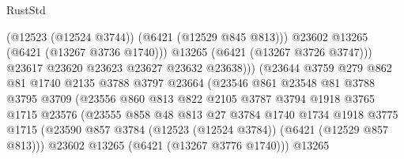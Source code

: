\begin{lexlean}{RustStd}
\begin{coremodule}
                                        (@12523 (@12524 @3744))
                                        (@6421 (@12529 @845 @813)))
                                      @23602
                                      @13265
                                      (@6421 (@13267 @3736 @1740)))
                                    @13265
                                    (@6421 (@13267 @3726 @3747)))
                                  @23617
                                  @23620
                                  @23623
                                  @23627
                                  @23632
                                  @23638)))
                            (@23644
                              @3759
                              @279
                              @862
                              @81
                              @1740
                              @2135
                              @3788
                              @3797
                              @23664
                              (@23546
                                @861
                                @23548
                                @81
                                @3788
                                @3795
                                @3709
                                (@23556
                                  @860
                                  @813
                                  @822
                                  @2105
                                  @3787
                                  @3794
                                  @1918
                                  @3765
                                  @1715
                                  @23576
                                  (@23555
                                    @858
                                    @48
                                    @813
                                    @27
                                    @3784
                                    @1740
                                    @1734
                                    @1918
                                    @3775
                                    @1715
                                    (@23590
                                      @857
                                      @3784
                                      (@12523 (@12524 @3784))
                                      (@6421 (@12529 @857 @813)))
                                    @23602
                                    @13265
                                    (@6421 (@13267 @3776 @1740)))
                                  @13265

\end{coremodule}
\end{lexlean}
